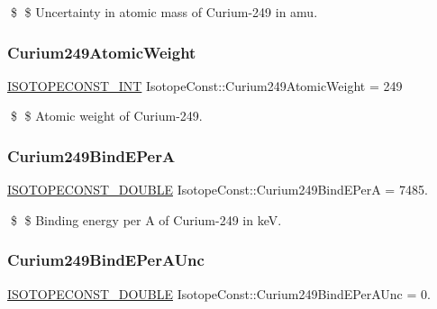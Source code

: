\$ \$ Uncertainty in atomic mass of Curium-\/249 in amu. \mbox{\label{group___isotope_const-_curium-_cm249_ga9c8f60897fa67e71b5972e6ed6be6d09}} 
\subsubsection{\texorpdfstring{Curium249\+Atomic\+Weight}{Curium249AtomicWeight}}
{\footnotesize\ttfamily \mbox{\hyperlink{group___isotope_const-_macros_ga5f18360b3e99483a35c32d789e62621c}{I\+S\+O\+T\+O\+P\+E\+C\+O\+N\+S\+T\+\_\+\+I\+NT}} Isotope\+Const\+::\+Curium249\+Atomic\+Weight = 249}

\$ \$ Atomic weight of Curium-\/249. \mbox{\label{group___isotope_const-_curium-_cm249_gaac55793fb0d592434fd251e22b7fbac6}} 
\subsubsection{\texorpdfstring{Curium249\+Bind\+E\+PerA}{Curium249BindEPerA}}
{\footnotesize\ttfamily \mbox{\hyperlink{group___isotope_const-_macros_ga8f45a7272ce02c0b4c65c44636ed719a}{I\+S\+O\+T\+O\+P\+E\+C\+O\+N\+S\+T\+\_\+\+D\+O\+U\+B\+LE}} Isotope\+Const\+::\+Curium249\+Bind\+E\+PerA = 7485.}

\$ \$ Binding energy per A of Curium-\/249 in keV. \mbox{\label{group___isotope_const-_curium-_cm249_ga4d112b36baf74206b740559290740e07}} 
\subsubsection{\texorpdfstring{Curium249\+Bind\+E\+Per\+A\+Unc}{Curium249BindEPerAUnc}}
{\footnotesize\ttfamily \mbox{\hyperlink{group___isotope_const-_macros_ga8f45a7272ce02c0b4c65c44636ed719a}{I\+S\+O\+T\+O\+P\+E\+C\+O\+N\+S\+T\+\_\+\+D\+O\+U\+B\+LE}} Isotope\+Const\+::\+Curium249\+Bind\+E\+Per\+A\+Unc = 0.}

